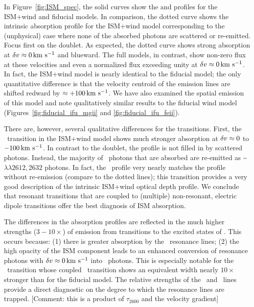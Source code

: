 \documentclass[12pt,preprint]{aastex}
\begin{document}
In Figure~\ref{fig:ISM_spec}, the solid curves show the  and
 profiles for the ISM+wind and fiducial 
models. In comparison, the
dotted curve shows the intrinsic absorption profile for the ISM+wind
model corresponding to the (unphysical) case
where none of the absorbed photons are scattered or re-emitted.   Focus first on the
 doublet.  As expected, the dotted curve shows strong
absorption at $\delta v \approx 0 \, {\rm km~s^{-1}}$ and blueward.  The full models,
in contrast, show non-zero flux at these velocities and even a
normalized flux exceeding unity at $\delta v \approx 0 \, {\rm km~s^{-1}}$.  In
fact, the ISM+wind model is nearly identical to the fiducial model;
the only quantitative difference is that the velocity centroid of
the emission lines are shifted redward by $\approx +100 \, {\rm km~s^{-1}}$.
We have also examined the spatial emission of this model and note
qualitatively similar results to the fiducial wind model
(Figures~\ref{fig:fiducial_ifu_mgii} and \ref{fig:fiducial_ifu_feii}).

There are, however, several qualitative differences 
for the  transitions. 
First, the \feiia\ transition in the ISM+wind model
shows much stronger absorption at $\delta v \approx 0$
to $-100 \, {\rm km~s^{-1}}$.  In contrast to the  doublet,
the profile is not filled in by scattered photons. Instead, 
the majority of \feiia\ photons that are absorbed are re-emitted as
\feiis\~$\lambda\lambda 2612, 2632$ photons.  In fact, the
\feiia\ profile very nearly matches the profile without re-emission 
(compare to the dotted lines); this transition provides a
very good description of the intrinsic ISM+wind optical depth profile.  
We conclude that resonant transitions that are coupled to (multiple)
non-resonant, electric dipole transitions offer the best
diagnosis of ISM absorption.

The differences in the  absorption profiles are reflected
in the much higher strengths ($3-10\times$) of emission from
transitions to the excited states of \aconfig.   This occurs because:
(1) there is greater absorption by the \feiid\
resonance lines; (2) the high opacity of the ISM component leads to
an enhanced conversion of resonance photons with $\delta v \approx 0\, {\rm km~s^{-1}}$
into \feiis\ photons.  This is especially notable for the
\feiib\ transition whose coupled \feiis\ transition shows an equivalent width nearly
$10\times$ stronger than for the fiducial model.  The relative
strengths of the \feiib\ and \feiie\ lines provide a direct
diagnostic on the degree to which the resonance lines are trapped.
[Comment:  this is a product of $\tau_{2600}$ and the velocity
gradient]
\end{document}
